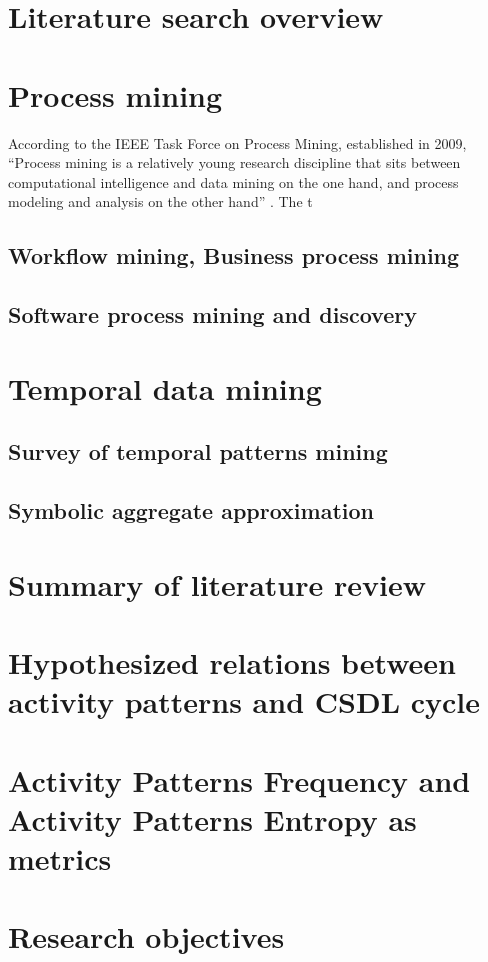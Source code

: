 \section{Literature search overview}

\section{Process mining}
According to the IEEE Task Force on Process Mining, established in 2009, ``Process mining is 
a relatively young research discipline that sits between computational intelligence and data 
mining on the one hand, and process modeling and analysis on the other hand'' \cite{citeulike:11077707}.
The t
\subsection{Workflow mining, Business process mining}


\subsection{Software process mining and discovery}

\section{Temporal data mining}
\subsection{Survey of temporal patterns mining}
\subsection{Symbolic aggregate approximation}

\section{Summary of literature review}

\section{Hypothesized relations between activity patterns and CSDL cycle}

\section{Activity Patterns Frequency and Activity Patterns Entropy as metrics}

\section{Research objectives}